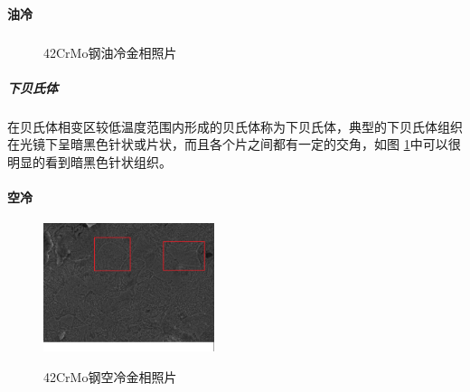 \documentclass[12pt]{ctexart}
\begin{document}
\paragraph{油冷}
\subparagraph{}
\begin{figure}[h]
  \centering
  \caption{42CrMo钢油冷金相照片}
  \label{42oil}
\end{figure}
\subparagraph{下贝氏体}
在贝氏体相变区较低温度范围内形成的贝氏体称为下贝氏体，典型的下贝氏体组织在光镜下呈暗黑色针状或片状，而且各个片之间都有一定的交角，如图 \ref{42oil}中可以很明显的看到暗黑色针状组织。
\newpage
\paragraph{空冷}
\begin{figure}
  \centering
  \includegraphics[width=5cm]{42airdian.jpg}\\
  \caption{42CrMo钢空冷金相照片}\label{42air}
\end{figure}
\end{document}
